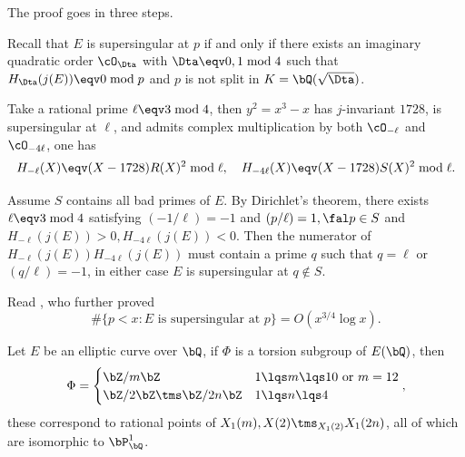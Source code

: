 \documentclass[a4paper, twoside]{article}
\begin{document}
\begin{prf}
	The proof goes in three steps.

	 Recall that $E$ is supersingular at $p$ if and only if there exists an imaginary quadratic order $\cO_{\Dta}$ with $\Dta\eqv0,1\bmod{4}$ such that $H_{\Dta}(j(E))\eqv0\bmod{p}$ and $p$ is not split in $K=\bQ(\sqrt{\Dta})$.

	 Take a rational prime $\ell\eqv3\bmod{4}$, then $y^{2}=x^{3}-x$ has $j$-invariant $1728$, is supersingular at $\ell$, and admits complex multiplication by both $\cO_{-\ell}$ and $\cO_{-4\ell}$, one has
	\[
		H_{-\ell}(X)\eqv(X-1728)R(X)^{2}\bmod{\ell},\quad H_{-4\ell}(X)\eqv(X-1728)S(X)^{2}\bmod{\ell}.
	\]

	 Assume $S$ contains all bad primes of $E$. By Dirichlet's theorem, there exists $\ell\eqv3\bmod{4}$ satisfying $(-1/\ell)=-1$ and $(p/\ell)=1,\fal p\in S$ and $H_{-\ell}(j(E))>0, H_{-4\ell}(j(E))<0$. Then the numerator of $H_{-\ell}(j(E))H_{-4\ell}(j(E))$ must contain a prime $q$ such that $q=\ell$ or $(q/\ell)=-1$, in either case $E$ is supersingular at $q\nin S$.
\end{prf}

\begin{rmk}
	Read \cite{Elkies1991Supersingular}, who further proved
	\[
		\#\{p<x:E\text{ is supersingular at } p\}=O(x^{3/4}\log{x}).
	\]
\end{rmk}


\begin{thm}
	Let $E$ be an elliptic curve over $\bQ$, if $\Phi$ is a torsion subgroup of $E(\bQ)$, then
	\[
		\Phi=\begin{cases}
			\bZ/m\bZ & \text{$1\lqs m\lqs10$ or $m=12$} \\
			\bZ/2\bZ\tms\bZ/2n\bZ & \text{$1\lqs n\lqs 4$}
		  \end{cases},
	\]
	these correspond to rational points of $X_{1}(m),X(2)\tms_{X_{1}(2)}X_{1}(2n)$, all of which are isomorphic to $\bP_{\bQ}^{1}$.
\end{thm}
\end{document}

